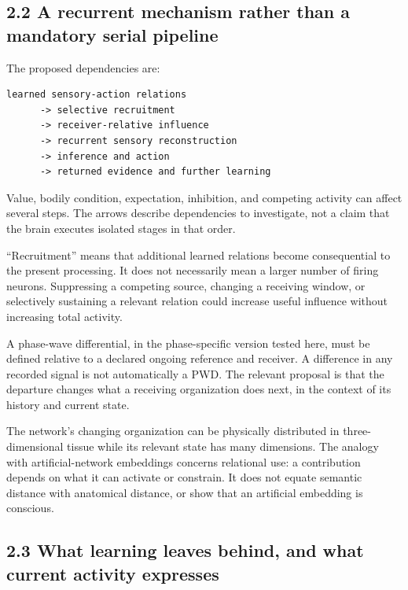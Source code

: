 \documentclass[
  american,
  11pt,
  letterpaper,
]{article}
\begin{document}
\subsection{2.2 A recurrent mechanism rather than a mandatory serial pipeline}\label{a-recurrent-mechanism-rather-than-a-mandatory-serial-pipeline}

The proposed dependencies are:

\begin{verbatim}
learned sensory-action relations
      -> selective recruitment
      -> receiver-relative influence
      -> recurrent sensory reconstruction
      -> inference and action
      -> returned evidence and further learning
\end{verbatim}

Value, bodily condition, expectation, inhibition, and competing activity can affect several steps. The arrows describe dependencies to investigate, not a claim that the brain executes isolated stages in that order.

``Recruitment'' means that additional learned relations become consequential to the present processing. It does not necessarily mean a larger number of firing neurons. Suppressing a competing source, changing a receiving window, or selectively sustaining a relevant relation could increase useful influence without increasing total activity.

A phase-wave differential, in the phase-specific version tested here, must be defined relative to a declared ongoing reference and receiver. A difference in any recorded signal is not automatically a PWD. The relevant proposal is that the departure changes what a receiving organization does next, in the context of its history and current state.

The network's changing organization can be physically distributed in three-dimensional tissue while its relevant state has many dimensions. The analogy with artificial-network embeddings concerns relational use: a contribution depends on what it can activate or constrain. It does not equate semantic distance with anatomical distance, or show that an artificial embedding is conscious.

\subsection{2.3 What learning leaves behind, and what current activity expresses}\label{what-learning-leaves-behind-and-what-current-activity-expresses}
\end{document}

